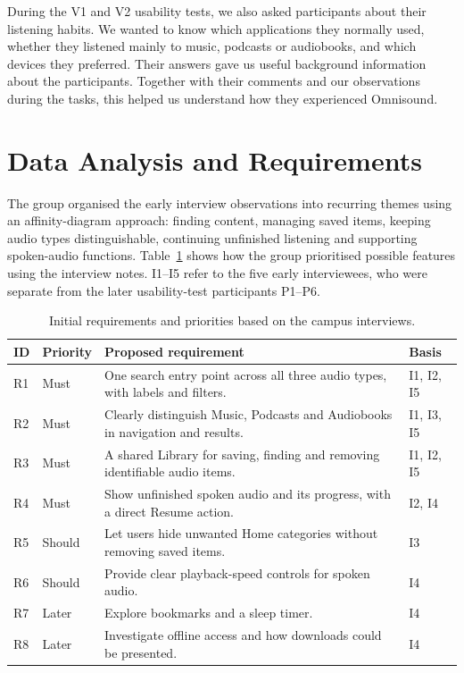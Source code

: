 During the V1 and V2 usability tests, we also asked participants about their listening habits. We wanted to know which applications they normally used, whether they listened mainly to music, podcasts or audiobooks, and which devices they preferred. Their answers gave us useful background information about the participants. Together with their comments and our observations during the tasks, this helped us understand how they experienced Omnisound.

\section{Data Analysis and Requirements}
\label{sec:method-analysis-requirements}

The group organised the early interview observations into recurring themes
using an affinity-diagram approach: finding content, managing saved items,
keeping audio types distinguishable, continuing unfinished listening and
supporting spoken-audio functions. Table~\ref{tab:method-requirements}
shows how the group prioritised possible features using the interview notes.
I1--I5 refer to the five early interviewees, who were separate from the
later usability-test participants P1--P6.

\begin{table}[!htbp]
  \centering
  \caption{Initial requirements and priorities based on the campus interviews.}
  \label{tab:method-requirements}
  \begingroup
  \small
  \renewcommand{\arraystretch}{1.15}
  \begin{tabular}{@{}p{}p{}p{}p{}@{}}
    \hline
    \textbf{ID} & \textbf{Priority} & \textbf{Proposed requirement} & \textbf{Basis} \\
    \hline
    R1 & Must & One search entry point across all three audio types, with labels and filters. & I1, I2, I5 \\
    R2 & Must & Clearly distinguish Music, Podcasts and Audiobooks in navigation and results. & I1, I3, I5 \\
    R3 & Must & A shared Library for saving, finding and removing identifiable audio items. & I1, I2, I5 \\
    R4 & Must & Show unfinished spoken audio and its progress, with a direct Resume action. & I2, I4 \\
    R5 & Should & Let users hide unwanted Home categories without removing saved items. & I3 \\
    R6 & Should & Provide clear playback-speed controls for spoken audio. & I4 \\
    R7 & Later & Explore bookmarks and a sleep timer. & I4 \\
    R8 & Later & Investigate offline access and how downloads could be presented. & I4 \\
    \hline
  \end{tabular}
  \endgroup
\end{table}

